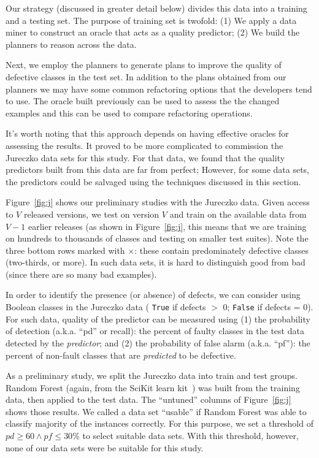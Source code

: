 \documentclass{sig-alternate}
\newcommand{\fig}[1]{Figure~\ref{fig:#1}}
\begin{document}
{\begin{itemize}[leftmargin=3mm]
Our strategy (discussed in greater detail below) divides this data into a training and a testing set. The purpose of training set is twofold: (1) We apply a data miner to construct an oracle that acts as a quality predictor; (2) We build the planners to reason across the data. 

Next, we employ the planners to generate plans to improve the quality of defective classes in the test set. In addition to the plans obtained from our planners we may have some common refactoring options that the developers tend to use. The oracle built previously can be used to assess the the changed examples and this can be used to compare refactoring operations.

It's worth noting that this approach depends on having effective oracles for assessing the results. It proved to be more complicated to commission the Jureczko data sets for this study. For that data, we found that the quality predictors built from this data are far from perfect; However, for some data sets, the  predictors could be salvaged using the techniques discussed in this section.

\fig{j} shows our preliminary studies with the Jureczko data. Given access to $V$ released versions, we test on version $V$ and train on the available data from $V-1$ earlier releases (as shown in \fig{j}, this means that we are training on hundreds to thousands of classes and testing on smaller test suites). Note the   \colorbox{lavenderpink}{three bottom} \colorbox{lavenderpink}{rows}   marked with $\times$: these contain predominately defective classes (two-thirds, or more).  In such data sets, it is hard to distinguish good from bad (since there are so many bad examples). 

In order to identify the presence (or absence) of defects, we can consider using Boolean classes in the  Jureczko data ( \texttt{True} if defects $\gt$ 0; \texttt{False} if defects = 0). For such data, quality of the predictor can be measured using (1) the  probability of detection (a.k.a. ``pd'' or recall):  the percent of faulty classes in the test data detected by the {\em predictor}; and (2) the  probability of false alarm (a.k.a. ``pf''): the percent of non-fault classes that are {\em predicted} to be defective.

As a preliminary study, we split the Jureczko  data into train and test groups. Random Forest (again, from the SciKit learn kit~\cite{Pedregosa2012}) was built from the training data, then applied to the test data. The ``untuned'' columns of \fig{j} shows those results. We called a data set ``usable'' if Random Forest was able to classify majority of the instances correctly. For this purpose, we set a threshold of $\mathit{pd}\ge 60 \wedge \mathit{pf} \le 30$\% to select suitable data sets. With this threshold, however, none of our data sets were be suitable for this study.


\end{itemize}}
\end{document}
